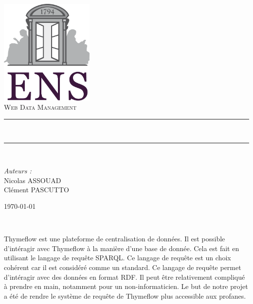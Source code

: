 \documentclass[a4paper, 12pt, twoside]{report}
\newcommand{\HRule}{\rule{\linewidth}{0.5mm}}
\begin{document}

\begin{titlepage}
\begin{center}

\includegraphics[width=0.35\textwidth]{./ENS_Logo.png}~\\[1cm]

\textsc{\Large Web Data Management}\\[0.5cm]

\HRule \\[0.4cm{ \huge \bfseries Langage Naturel Pour Thymeflow\\[0.4cm] }]

\HRule \\[1.5cm]
\end{center}

\begin{minipage}{0.4\textwidth}
\begin{flushleft} \large
\emph{Auteurs :}\\
Nicolas ASSOUAD\\
Clément PASCUTTO\\
\end{flushleft}
\end{minipage}

\begin{center}
\vfill
{\large \today}

\end{center}
\end{titlepage}

\newpage~

Thymeflow est une plateforme de centralisation de données. Il est possible d'intéragir avec Thymeflow à la manière d'une base de donnée. Cela est fait en utilisant le langage de requête SPARQL. Ce langage de requête est un choix cohérent car il est considéré comme un standard. Ce langage de requête permet d'intéragir avec des données en format RDF. Il peut être relativement compliqué à prendre en main, notamment pour un non-informaticien. Le but de notre projet a été de rendre le système de requête de Thymeflow plus accessible aux profanes.\\
\end{document}
